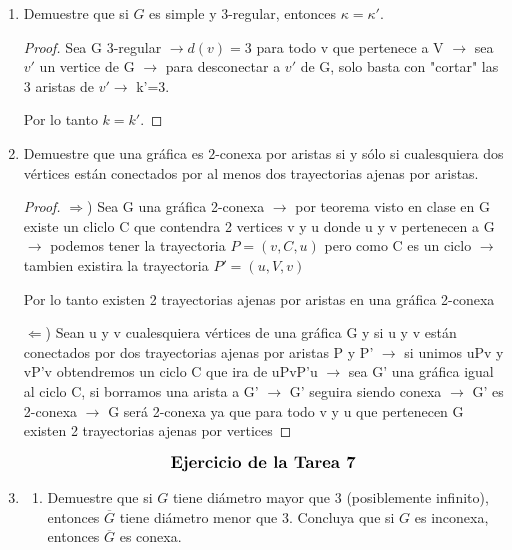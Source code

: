 \documentclass{article}
\begin{document}
\begin{enumerate}
  \item \text{[Pregunta 1]}

    Demuestre que si $G$ es simple y $3$-regular, entonces $\kappa = \kappa'$.

    \begin{proof}
      Sea G 3-regular $\rightarrow d(v)=3$ para todo v que pertenece a V $\rightarrow$ sea $v'$ un vertice de G  $\rightarrow$ para desconectar a $v'$ de G, solo basta  con "cortar" las 3 aristas de $v' \rightarrow$ k'=3.

      Por lo tanto $k=k'$.
    \end{proof}

  \item \text{[Pregunta 2]}

    Demuestre que una gr\'afica es $2$-conexa por aristas si y s\'olo si
    cualesquiera dos v\'ertices est\'an conectados por al menos dos trayectorias
    ajenas por aristas.

    \begin{proof}
      $\Longrightarrow$) Sea G una gráfica 2-conexa $\rightarrow$ por teorema visto en clase en G existe  un cliclo C que contendra 2 vertices v y u donde u y v pertenecen a G $\rightarrow$ podemos tener la trayectoria $P=(v,C,u)$ pero como C es un ciclo $\rightarrow$ tambien existira la trayectoria $P'=(u,V,v)$

      Por lo tanto existen 2 trayectorias ajenas por aristas en una gráfica 2-conexa


      $\Longleftarrow$) Sean u y v cualesquiera vértices de una gráfica G y si u y v están conectados por dos trayectorias ajenas por aristas P y P' $\rightarrow$ si unimos  uPv y vP'v obtendremos un ciclo C que ira de uPvP'u $\rightarrow$ sea G' una gráfica igual al ciclo C, si borramos una arista a G' $\rightarrow$ G' seguira siendo conexa  $\rightarrow$ G' es 2-conexa $\rightarrow$ G será 2-conexa ya que para todo v y u que pertenecen G existen 2 trayectorias ajenas por vertices
    \end{proof}

  $$\text{\textbf{\large Ejercicio de la Tarea 7}}$$
  \item \text{[Ejercicio 1]}

    \begin{enumerate}
      \item Demuestre que si $G$ tiene di\'ametro mayor que $3$ (posiblemente
      infinito), entonces $\overline{G}$ tiene di\'ametro menor que $3$.
      Concluya que si $G$ es inconexa, entonces $\overline{G}$ es conexa.


\end{enumerate}
\end{enumerate}
\end{document}

